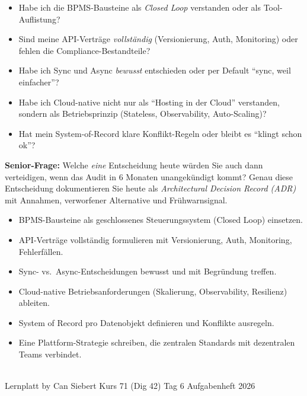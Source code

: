 \documentclass[11pt,a4paper,oneside]{article}
\begin{document}
\begin{itemize}
  \item Habe ich die BPMS-Bausteine als \emph{Closed Loop} verstanden oder als Tool-Auflistung?
  \item Sind meine API-Vertr\"age \emph{vollst\"andig} (Versionierung, Auth, Monitoring) \textendash{} oder fehlen die Compliance-Bestandteile?
  \item Habe ich Sync und Async \emph{bewusst} entschieden \textendash{} oder per Default ``sync, weil einfacher''?
  \item Habe ich Cloud-native nicht nur als ``Hosting in der Cloud'' verstanden, sondern als Betriebsprinzip (Stateless, Observability, Auto-Scaling)?
  \item Hat mein System-of-Record klare Konflikt-Regeln \textendash{} oder bleibt es ``klingt schon ok''?
\end{itemize}

\medskip
\noindent\textbf{Senior-Frage:} Welche \emph{eine} Entscheidung heute w\"urden Sie auch dann verteidigen, wenn das Audit in 6 Monaten unangek\"undigt kommt? Genau diese Entscheidung dokumentieren Sie heute als \emph{Architectural Decision Record (ADR)} mit Annahmen, verworfener Alternative und Fr\"uhwarnsignal.

\medskip
\begin{infobox}
\begin{itemize}
  \item BPMS-Bausteine als geschlossenes Steuerungssystem (Closed Loop) einsetzen.
  \item API-Vertr\"age vollst\"andig formulieren \textendash{} mit Versionierung, Auth, Monitoring, Fehlerf\"allen.
  \item Sync- vs.\ Async-Entscheidungen bewusst und mit Begr\"undung treffen.
  \item Cloud-native Betriebsanforderungen (Skalierung, Observability, Resilienz) ableiten.
  \item System of Record pro Datenobjekt definieren \textendash{} und Konflikte ausregeln.
  \item Eine Plattform-Strategie schreiben, die zentralen Standards mit dezentralen Teams verbindet.
\end{itemize}
\end{infobox}

\vspace{1cm}
\noindent{\color{lpAccent}\rule{\linewidth}{0.6pt}}\\[4pt]
{\footnotesize\sffamily\color{lpGray}Lernplatt \textperiodcentered{} by Can Siebert \textperiodcentered{} Kurs 71 (Dig 42) \textperiodcentered{} Tag 6 \textperiodcentered{} Aufgabenheft \textperiodcentered{} \textcopyright{} 2026}
\end{document}
